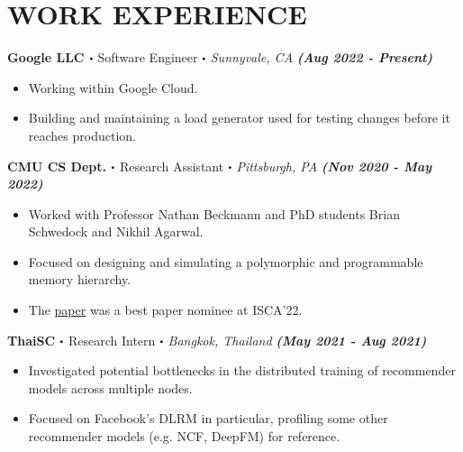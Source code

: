 \documentclass[10pt]{article}
\newcommand\sbullet[1][.5]{\mathbin{\vcenter{\hbox{\scalebox{#1}{$\bullet$}}}}}
\begin{document}
  \section*{\large \textcolor{lighterB} {WORK EXPERIENCE}}
  \vspace*{-0.23cm}

  \textbf{\large Google LLC $\sbullet$} {\large Software Engineer $\sbullet$ \textit{Sunnyvale, CA} \hfill \textit{\textbf{(Aug 2022 - Present)}}}

  \vspace*{-0.2cm}
  \begin{itemize}
    \itemsep-0.4em
    \item \textcolor{lighterG}{Working within Google Cloud.}
    \item \textcolor{lighterG}{Building and maintaining a load generator used for testing changes before it reaches production.}
  \end{itemize}

  \textbf{\large CMU CS Dept. $\sbullet$} {\large Research Assistant $\sbullet$ \textit{Pittsburgh, PA} \hfill \textit{\textbf{(Nov 2020 - May 2022)}}}

  \vspace*{-0.2cm}
  \begin{itemize}
    \itemsep-0.4em
    \item \textcolor{lighterG}{Worked with Professor Nathan Beckmann and PhD students Brian Schwedock and Nikhil Agarwal.}
    \item \textcolor{lighterG}{Focused on designing and simulating a polymorphic and programmable memory hierarchy.}
    \item \textcolor{lighterG}{The \href{https://dl.acm.org/doi/10.1145/3470496.3527379}{paper} was a best paper nominee at ISCA'22.}
  \end{itemize}

  \textbf{\large ThaiSC $\sbullet$} {\large Research Intern $\sbullet$ \textit{Bangkok, Thailand} \hfill \textit{\textbf{(May 2021 - Aug 2021)}}}

  \vspace*{-0.2cm}
  \begin{itemize}
    \itemsep-0.4em
    \item \textcolor{lighterG}{Investigated potential bottlenecks in the distributed training of recommender models across multiple nodes.}
    \item \textcolor{lighterG}{Focused on Facebook's DLRM in particular, profiling some other recommender models (e.g. NCF, DeepFM) for reference.}
  \end{itemize}
\end{document}
